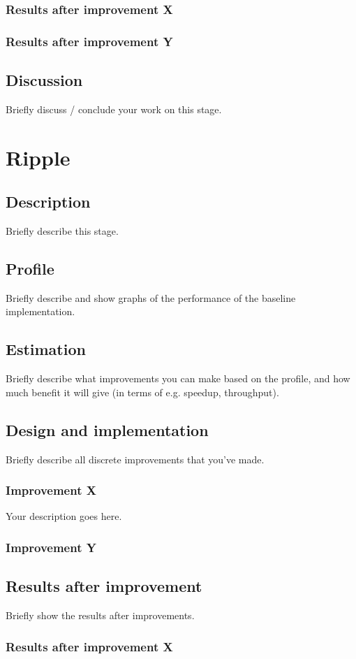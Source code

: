 \documentclass[twocolumn]{article}
\begin{document}
\subsubsection{Results after improvement X}
\subsubsection{Results after improvement Y}
\subsection{Discussion}
Briefly discuss / conclude your work on this stage.

\section{Ripple}
\subsection{Description}
Briefly describe this stage.
\subsection{Profile}
Briefly describe and show graphs of the performance of the baseline implementation.
\subsection{Estimation}
Briefly describe what improvements you can make based on the profile, and how much benefit it will give (in terms of e.g. speedup, throughput).
\subsection{Design and implementation}
Briefly describe all discrete improvements that you've made.
\subsubsection{Improvement X}
Your description goes here.
\subsubsection{Improvement Y}
\subsection{Results after improvement}
Briefly show the results after improvements.
\subsubsection{Results after improvement X}
\end{document}
